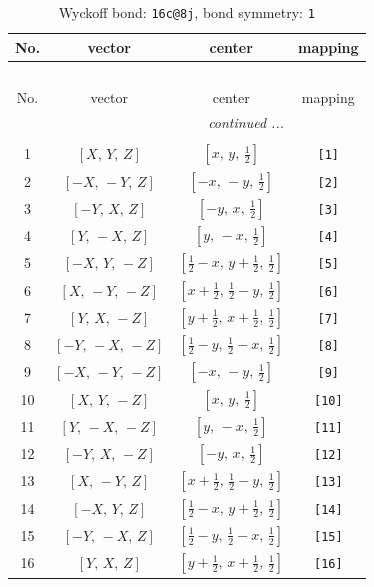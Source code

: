 \documentclass[fleqn,8pt]{jsarticle}
\begin{document}
\begin{longtable}{cccc}
\caption{Wyckoff bond: {\tt 16c@8j}, bond symmetry: {\tt 1}}
 \\
 \hline \hline
No. & vector & center & mapping \\ \hline \endfirsthead

\multicolumn{3}{l}{\tablename\ \thetable{}} \\
 \hline \hline
No. & vector & center & mapping \\ \hline \endhead

 \hline \hline
\multicolumn{3}{r}{\footnotesize\it continued ...} \\ \endfoot

 \hline \hline
\multicolumn{3}{r}{} \\ \endlastfoot

1 & $\left[ X,\, Y,\, Z \right]$ & $\left[ x,\, y,\, \frac{1}{2} \right]$ & {\tt [1]} \\ \hline
2 & $\left[ - X,\, - Y,\, Z \right]$ & $\left[ - x,\, - y,\, \frac{1}{2} \right]$ & {\tt [2]} \\ \hline
3 & $\left[ - Y,\, X,\, Z \right]$ & $\left[ - y,\, x,\, \frac{1}{2} \right]$ & {\tt [3]} \\ \hline
4 & $\left[ Y,\, - X,\, Z \right]$ & $\left[ y,\, - x,\, \frac{1}{2} \right]$ & {\tt [4]} \\ \hline
5 & $\left[ - X,\, Y,\, - Z \right]$ & $\left[ \frac{1}{2} - x,\, y + \frac{1}{2},\, \frac{1}{2} \right]$ & {\tt [5]} \\ \hline
6 & $\left[ X,\, - Y,\, - Z \right]$ & $\left[ x + \frac{1}{2},\, \frac{1}{2} - y,\, \frac{1}{2} \right]$ & {\tt [6]} \\ \hline
7 & $\left[ Y,\, X,\, - Z \right]$ & $\left[ y + \frac{1}{2},\, x + \frac{1}{2},\, \frac{1}{2} \right]$ & {\tt [7]} \\ \hline
8 & $\left[ - Y,\, - X,\, - Z \right]$ & $\left[ \frac{1}{2} - y,\, \frac{1}{2} - x,\, \frac{1}{2} \right]$ & {\tt [8]} \\ \hline
9 & $\left[ - X,\, - Y,\, - Z \right]$ & $\left[ - x,\, - y,\, \frac{1}{2} \right]$ & {\tt [9]} \\ \hline
10 & $\left[ X,\, Y,\, - Z \right]$ & $\left[ x,\, y,\, \frac{1}{2} \right]$ & {\tt [10]} \\ \hline
11 & $\left[ Y,\, - X,\, - Z \right]$ & $\left[ y,\, - x,\, \frac{1}{2} \right]$ & {\tt [11]} \\ \hline
12 & $\left[ - Y,\, X,\, - Z \right]$ & $\left[ - y,\, x,\, \frac{1}{2} \right]$ & {\tt [12]} \\ \hline
13 & $\left[ X,\, - Y,\, Z \right]$ & $\left[ x + \frac{1}{2},\, \frac{1}{2} - y,\, \frac{1}{2} \right]$ & {\tt [13]} \\ \hline
14 & $\left[ - X,\, Y,\, Z \right]$ & $\left[ \frac{1}{2} - x,\, y + \frac{1}{2},\, \frac{1}{2} \right]$ & {\tt [14]} \\ \hline
15 & $\left[ - Y,\, - X,\, Z \right]$ & $\left[ \frac{1}{2} - y,\, \frac{1}{2} - x,\, \frac{1}{2} \right]$ & {\tt [15]} \\ \hline
16 & $\left[ Y,\, X,\, Z \right]$ & $\left[ y + \frac{1}{2},\, x + \frac{1}{2},\, \frac{1}{2} \right]$ & {\tt [16]} \\
\end{longtable}
\end{document}
